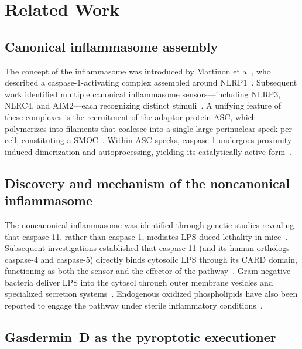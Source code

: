 \documentclass[11pt,a4paper]{article}
\begin{document}
\section{Related Work}
\label{sec:related}

\subsection{Canonical inflammasome assembly}

The concept of the inflammasome was introduced by Martinon et al., who described a caspase-1-activating complex assembled around NLRP1~\citep{martinon2002}. Subsequent work identified multiple canonical inflammasome sensors---including NLRP3, NLRC4, and AIM2---each recognizing distinct stimuli~\citep{schroder2010, latz2013}. A unifying feature of these complexes is the recruitment of the adaptor protein ASC, which polymerizes into filaments that coalesce into a single large perinuclear speck per cell, constituting a SMOC~\citep{broz2016}. Within ASC specks, caspase-1 undergoes proximity-induced dimerization and autoprocessing, yielding its catalytically active form~\citep{broz2010, man2017}.

\subsection{Discovery and mechanism of the noncanonical inflammasome}

The noncanonical inflammasome was identified through genetic studies revealing that caspase-11, rather than caspase-1, mediates LPS-duced lethality in mice~\citep{kayagaki2011}. Subsequent investigations established that caspase-11 (and its human orthologs caspase-4 and caspase-5) directly binds cytosolic LPS through its CARD domain, functioning as both the sensor and the effector of the pathway~\citep{shi2014, hagar2013}. Gram-negative bacteria deliver LPS into the cytosol through outer membrane vesicles and specialized secretion systems~\citep{vanaja2016}. Endogenous oxidized phospholipids have also been reported to engage the pathway under sterile inflammatory conditions~\citep{zanoni2016}.

\subsection{Gasdermin~D as the pyroptotic executioner}
\end{document}
